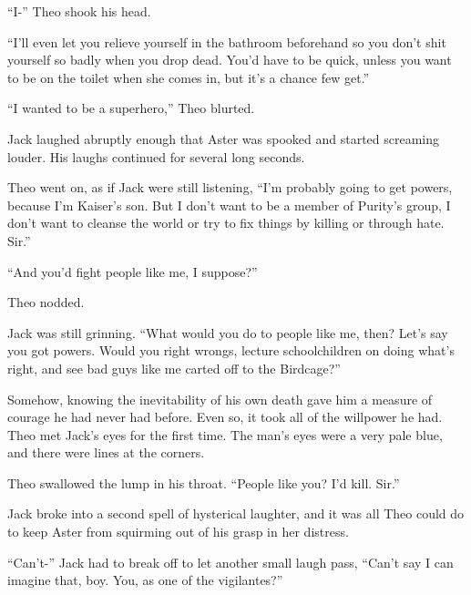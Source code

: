 ``I-''  Theo shook his head.



``I'll even let you relieve yourself in the bathroom beforehand so you don't shit yourself so badly when you drop dead.  You'd have to be quick, unless you want to be on the toilet when she comes in, but it's a chance few get.''



``I wanted to be a superhero,'' Theo blurted.



Jack laughed abruptly enough that Aster was spooked and started screaming louder.  His laughs continued for several long seconds.



Theo went on, as if Jack were still listening, ``I'm probably going to get powers, because I'm Kaiser's son.  But I don't want to be a member of Purity's group, I don't want to cleanse the world or try to fix things by killing or through hate.  Sir.''



``And you'd fight people like me, I suppose?''



Theo nodded.



Jack was still grinning.  ``What would you do to people like me, then?  Let's say you got powers.  Would you right wrongs, lecture schoolchildren on doing what's right, and see bad guys like me carted off to the Birdcage?''



Somehow, knowing the inevitability of his own death gave him a measure of courage he had never had before.  Even so, it took all of the willpower he had.  Theo met Jack's eyes for the first time.  The man's eyes were a very pale blue, and there were lines at the corners.



Theo swallowed the lump in his throat.  ``People like you?  I'd kill.  Sir.''



Jack broke into a second spell of hysterical laughter, and it was all Theo could do to keep Aster from squirming out of his grasp in her distress.



``Can't-'' Jack had to break off to let another small laugh pass, ``Can't say I can imagine that, boy.  You, as one of the vigilantes?''



